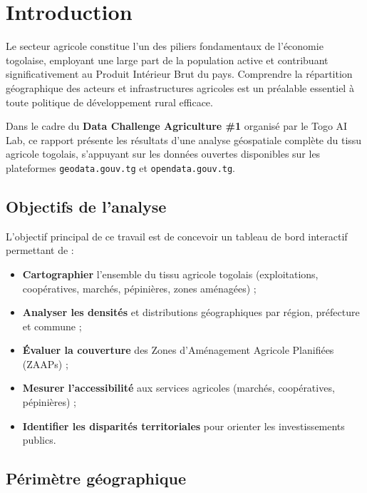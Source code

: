 \documentclass[12pt, a4paper]{article}
\begin{document}
\newpage
\tableofcontents
\newpage

\section{Introduction}

Le secteur agricole constitue l'un des piliers fondamentaux de l'économie togolaise, employant une large part
de la population active et contribuant significativement au Produit Intérieur Brut du pays. Comprendre la
répartition géographique des acteurs et infrastructures agricoles est un préalable essentiel à toute politique
de développement rural efficace.

Dans le cadre du \textbf{Data Challenge Agriculture \#1} organisé par le Togo AI Lab, ce rapport présente
les résultats d'une analyse géospatiale complète du tissu agricole togolais, s'appuyant sur les données
ouvertes disponibles sur les plateformes \texttt{geodata.gouv.tg} et \texttt{opendata.gouv.tg}.

\subsection{Objectifs de l'analyse}

L'objectif principal de ce travail est de concevoir un tableau de bord interactif permettant de :

\begin{itemize}[leftmargin=1.5em]
    \item \textbf{Cartographier} l'ensemble du tissu agricole togolais (exploitations, coopératives, marchés,
          pépinières, zones aménagées) ;
    \item \textbf{Analyser les densités} et distributions géographiques par région, préfecture et commune ;
    \item \textbf{Évaluer la couverture} des Zones d'Aménagement Agricole Planifiées (ZAAPs) ;
    \item \textbf{Mesurer l'accessibilité} aux services agricoles (marchés, coopératives, pépinières) ;
    \item \textbf{Identifier les disparités territoriales} pour orienter les investissements publics.
\end{itemize}

\subsection{Périmètre géographique}
\end{document}
